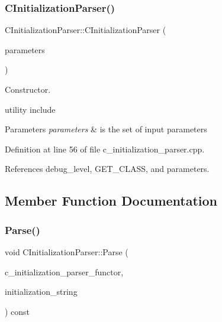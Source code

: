 \subsubsection{\texorpdfstring{C\+Initialization\+Parser()}{CInitializationParser()}}
{\footnotesize\ttfamily C\+Initialization\+Parser\+::\+C\+Initialization\+Parser (\begin{DoxyParamCaption}\item[{const \hyperlink{Parameter_8hpp_a37841774a6fcb479b597fdf8955eb4ea}{Parameter\+Const\+Ref}}]{parameters }\end{DoxyParamCaption})}



Constructor. 

utility include


\begin{DoxyParams}{Parameters}
{\em parameters} & is the set of input parameters \\
\hline
\end{DoxyParams}


Definition at line 56 of file c\+\_\+initialization\+\_\+parser.\+cpp.



References debug\+\_\+level, G\+E\+T\+\_\+\+C\+L\+A\+SS, and parameters.



\subsection{Member Function Documentation}
\mbox{\label{classCInitializationParser_adef21cf1b94ba814a5a49ed8f25c5292}} 
\subsubsection{\texorpdfstring{Parse()}{Parse()}}
{\footnotesize\ttfamily void C\+Initialization\+Parser\+::\+Parse (\begin{DoxyParamCaption}\item[{const \hyperlink{c__initialization__parser__functor_8hpp_a6ef48614177b399e30c2c728bd1aa4a0}{C\+Initialization\+Parser\+Functor\+Ref}}]{c\+\_\+initialization\+\_\+parser\+\_\+functor,  }\item[{const std\+::string \&}]{initialization\+\_\+string }\end{DoxyParamCaption}) const}



